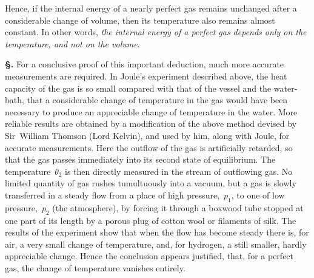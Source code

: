 \documentclass[12pt]{book}[2005/09/16]
\newcommand{\Section}[1]{
  \medskip\par\textbf{§\;#1}
  \label{section:#1}
}
\begin{document}
Hence, if the internal energy of a nearly perfect gas
%
remains unchanged after a considerable change of volume,
then its temperature also remains almost constant. In other
words, \emph{the internal energy of a perfect gas depends only on the
temperature, and not on the volume}.

\Section{70.} For a conclusive proof of this important deduction,
%
%
much more accurate measurements are required. In
Joule's experiment described above, the heat capacity of
the gas is so small compared with that of the vessel and the
water-bath, that a considerable change of temperature in
the gas would have been necessary to produce an appreciable
change of temperature in the water. More reliable results
are obtained by a modification of the above method devised
by Sir~William Thomson (Lord Kelvin), and used by him,
along with Joule, for accurate measurements. Here the
outflow of the gas is artificially retarded, so that the gas
passes immediately into its second state of equilibrium.
The temperature~$\theta_{2}$ is then directly measured in the stream
of outflowing gas. No limited quantity of gas rushes
tumultuously into a vacuum, but a gas is slowly transferred
in a steady flow from a place of high pressure,~$p_{1}$, to one of
low pressure,~$p_{2}$ (the atmosphere), by forcing it through a
boxwood tube stopped at one part of its length by a porous
plug of cotton wool or filaments of silk. The results of the
experiment show that when the flow has become steady there
is, for air, a very small change of temperature, and, for hydrogen,
a still smaller, hardly appreciable change. Hence the
conclusion appears justified, that, for a perfect gas, the
change of temperature vanishes entirely.
\end{document}
